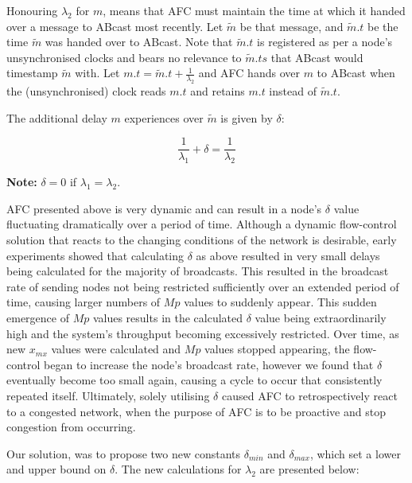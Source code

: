         Honouring $\lambda_2$ for $m$, means that AFC must maintain the time at which it handed over a message to \textsf{ABcast} most recently.  Let $\tilde{m}$ be that message, and $\tilde{m}.t$ be the time $\tilde{m}$ was handed over to \textsf{ABcast}.  Note that $\tilde{m}.t$ is registered as per a node's unsynchronised clocks and bears no relevance to $\tilde{m}.ts$ that \textsf{ABcast} would timestamp $\tilde{m}$ with.  Let $m.t = \tilde{m}.t + \frac{1}{\lambda_2}$ and AFC hands over $m$ to \textsf{ABcast} when the (unsynchronised) clock reads $m.t$ and retains $m.t$ instead of $\tilde{m}.t$.  
        
        The additional delay $m$ experiences over $\tilde{m}$ is given by $\delta$:
        
        \begin{equation}
            \frac{1}{\lambda_1} + \delta = \frac{1}{\lambda_2}
        \end{equation}
        
        \textbf{Note: } $\delta = 0$ if $\lambda_1 = \lambda_2$.  
        
    AFC presented above is very dynamic and can result in a node's $\delta$ value fluctuating dramatically over a period of time.  Although a dynamic flow-control solution that reacts to the changing conditions of the network is desirable, early experiments showed that calculating $\delta$ as above resulted in very small delays being calculated for the majority of broadcasts.  This resulted in the broadcast rate of sending nodes not being restricted sufficiently over an extended period of time, causing larger numbers of $Mp$ values to suddenly appear. This sudden emergence of $Mp$ values results in the calculated $\delta$ value being extraordinarily high and the system's throughput becoming excessively restricted.  Over time, as new $x_{mx}$ values were calculated and $Mp$ values stopped appearing, the flow-control began to increase the node's broadcast rate, however we found that $\delta$ eventually become too small again, causing a cycle to occur that consistently repeated itself.  Ultimately, solely utilising $\delta$ caused AFC to retrospectively react to a congested network, when the purpose of AFC is to be proactive and stop congestion from occurring.  
    
    Our solution, was to propose two new constants $\delta_{min}$ and $\delta_{max}$, which set a lower and upper bound on $\delta$.  The new calculations for $\lambda_2$ are presented below:
    
